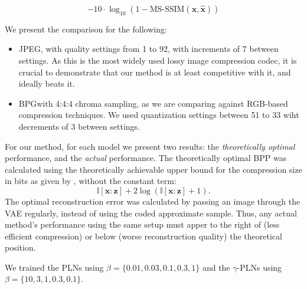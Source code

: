 \documentclass{article}
\renewcommand{\vec}[1]{\mathbf{#1}}
\newcommand{\I}{\mathbb{I}}
\begin{document}
\begin{equation}
\label{eq:metric_ms_ssim}
-10 \cdot \log_{10}\left( 1 - \text{MS-SSIM}(\vec{x}, \vec{\hat{x}}) \right)
\end{equation}

We present the comparison for the following:
\begin{itemize}
\item JPEG, with quality settings from 1 to 92, with increments of 7 between
  settings. As this is the most widely used lossy image compression codec, it is
  crucial to demonstrate that our method is at least competitive with it, and
  ideally beats it.
\item BPG\footnotemark with 4:4:4 chroma sampling, as we are comparing against
  RGB-based compression techniques. We used quantization settings between 51 to
  33 wiht decrements of 3 between settings.
\end{itemize}

\par
For our method, for each model we present two results: the \textit{theoretically
optimal} performance, and the \textit{actual} performance. The theoretically
optimal BPP was calculated using the theoretically achievable upper bound for
the compression size in bits as given by \cite{harsha2007communication},
without the constant term:
\[
  \I[\vec{x} : \vec{z}] + 2 \log \left( \I[\vec{x} : \vec{z}] + 1\right).
\]
The optimal reconstruction error was calculated by passing an image through the
VAE regularly, instead of using the coded approximate sample. Thus, any
actual method's performance using the same setup must apper to the right of (less
efficient compression) or below (worse reconstruction quality) the theoretical
position.

We trained the PLNs using $\beta = \{0.01, 0.03, 0.1, 0.3, 1\}$ and the
$\gamma$-PLNs using $\beta = \{10, 3, 1, 0.3, 0.1\}$.
\end{document}

